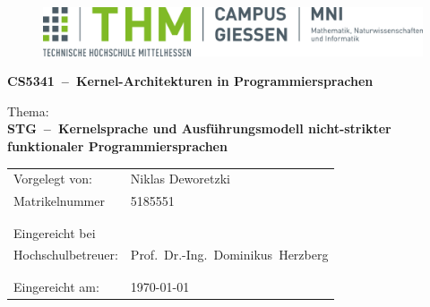 \documentclass[12pt]{report}
\newcommand{\MyName}{Niklas Deworetzki}
\newcommand{\MyTitle}{CS5341~--~Kernel-Architekturen in Programmiersprachen}
\newcommand{\MyTopic}{STG~--~Kernelsprache und Ausführungsmodell nicht-strikter funktionaler Programmiersprachen}        %
\renewcommand\_{\textunderscore\allowbreak}
\begin{document}
\pagestyle{empty}


\begin{titlepage}
  \begin{center}
    \begin{figure}
      \includegraphics[width=.9\textwidth]{LOGO_THM_CG_FB06}
    \end{figure}
  \end{center}
  \Large
  \begin{center}
    \vspace{1cm}
    \textbf{\MyTitle{}}\linebreak
    \vspace{1cm}
  \end{center}
  \large
  Thema:\\
  \textbf{\MyTopic{}}

  \normalsize
  \vfill
  \begin{center}
    \begin{tabular*}{0.75\textwidth}%
      {@{\extracolsep{\fill}}ll}

      {Vorgelegt von:} & {\MyName{}}\\
      {Matrikelnummer} & {5185551}\\
      {} & {}\\
      {} & {}\\
      {Eingereicht bei} & {}\\
      {Hochschulbetreuer:} & {Prof.\ Dr.-Ing.\ Dominikus\ Herzberg}\\
      {} & {}\\
      {} & {}\\
      {Eingereicht am:} & {\today}

    \end{tabular*}
  \end{center}

  \vfill
\end{titlepage}

\addtocounter{page}{1}
\pagestyle{fancy}

\tableofcontents
\end{document}
